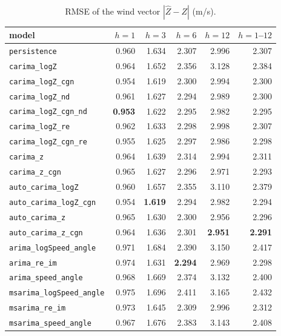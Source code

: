 \documentclass[11pt,a4paper]{article}
\newcommand{\1}{\mathbf{1}}
\begin{document}
\begin{table}[H]
  \centering
  \caption{RMSE of the wind vector $|\hat Z - Z|$ (m/s).}\label{tab:rmse-z}
  \begin{tabular}{lrrrrr}
    \toprule
    model & $h=1$ & $h=3$ & $h=6$ & $h=12$ & $h=1$--$12$ \\
    \midrule
\texttt{persistence} & 0.960 & 1.634 & 2.307 & 2.996 & 2.307 \\ \midrule
\texttt{carima\_logZ} & 0.964 & 1.652 & 2.356 & 3.128 & 2.384 \\
\texttt{carima\_logZ\_cgn} & 0.954 & 1.619 & 2.300 & 2.994 & 2.300 \\
\texttt{carima\_logZ\_nd} & 0.961 & 1.627 & 2.294 & 2.989 & 2.300 \\
\texttt{carima\_logZ\_cgn\_nd} & \textbf{0.953} & 1.622 & 2.295 & 2.982 & 2.295 \\
\texttt{carima\_logZ\_re} & 0.962 & 1.633 & 2.298 & 2.998 & 2.307 \\
\texttt{carima\_logZ\_cgn\_re} & 0.955 & 1.625 & 2.297 & 2.986 & 2.298 \\
\texttt{carima\_z} & 0.964 & 1.639 & 2.314 & 2.994 & 2.311 \\
\texttt{carima\_z\_cgn} & 0.965 & 1.627 & 2.296 & 2.971 & 2.293 \\ \midrule
\texttt{auto\_carima\_logZ} & 0.960 & 1.657 & 2.355 & 3.110 & 2.379 \\
\texttt{auto\_carima\_logZ\_cgn} & 0.954 & \textbf{1.619} & 2.294 & 2.982 & 2.294 \\
\texttt{auto\_carima\_z} & 0.965 & 1.630 & 2.300 & 2.956 & 2.296 \\
\texttt{auto\_carima\_z\_cgn} & 0.964 & 1.636 & 2.301 & \textbf{2.951} & \textbf{2.291} \\ \midrule
\texttt{arima\_logSpeed\_angle} & 0.971 & 1.684 & 2.390 & 3.150 & 2.417 \\
\texttt{arima\_re\_im} & 0.974 & 1.631 & \textbf{2.294} & 2.969 & 2.298 \\
\texttt{arima\_speed\_angle} & 0.968 & 1.669 & 2.374 & 3.132 & 2.400 \\
\texttt{msarima\_logSpeed\_angle} & 0.975 & 1.696 & 2.411 & 3.165 & 2.432 \\
\texttt{msarima\_re\_im} & 0.973 & 1.645 & 2.309 & 2.996 & 2.312 \\
\texttt{msarima\_speed\_angle} & 0.967 & 1.676 & 2.383 & 3.143 & 2.408 \\
    \bottomrule
  \end{tabular}
\end{table}
\end{document}
